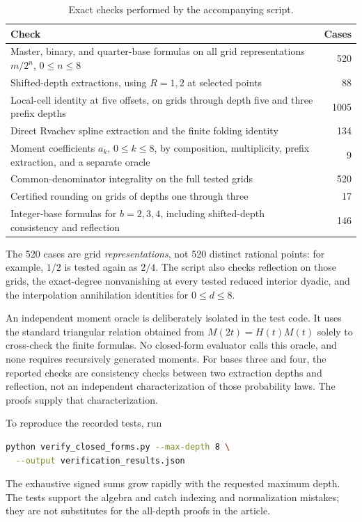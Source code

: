 \documentclass[11pt,a4paper]{article}
\numberwithin{equation}{section}
\theoremstyle{definition}
\theoremstyle{remark}
\begin{document}
\begin{table}[htbp]
\centering
\caption{Exact checks performed by the accompanying script.}
\label{tab:checks}
\begin{tabularx}{\textwidth}{@{}Xr@{}}
\toprule
Check & Cases\\
\midrule
Master, binary, and quarter-base formulas on all grid representations $m/2^n$, $0\le n\le8$ & 520\\
Shifted-depth extractions, using $R=1,2$ at selected points & 88\\
Local-cell identity at five offsets, on grids through depth five and three prefix depths & 1005\\
Direct Rvachev spline extraction and the finite folding identity & 134\\
Moment coefficients $a_k$, $0\le k\le8$, by composition, multiplicity, prefix extraction, and a separate oracle & 9\\
Common-denominator integrality on the full tested grids & 520\\
Certified rounding on grids of depths one through three & 17\\
Integer-base formulas for $b=2,3,4$, including shifted-depth consistency and reflection & 146\\
\bottomrule
\end{tabularx}
\end{table}

The 520 cases are grid \emph{representations}, not 520 distinct rational points: for example, $1/2$ is tested again as $2/4$. The script also checks reflection on those grids, the exact-degree nonvanishing at every tested reduced interior dyadic, and the interpolation annihilation identities for $0\le d\le8$.

An independent moment oracle is deliberately isolated in the test code. It uses the standard triangular relation obtained from $M(2t)=H(t)M(t)$ solely to cross-check the finite formulas. No closed-form evaluator calls this oracle, and none requires recursively generated moments. For bases three and four, the reported checks are consistency checks between two extraction depths and reflection, not an independent characterization of those probability laws. The proofs supply that characterization.

To reproduce the recorded tests, run
\begin{lstlisting}[language=bash]
python verify_closed_forms.py --max-depth 8 \
  --output verification_results.json
\end{lstlisting}
The exhaustive signed sums grow rapidly with the requested maximum depth. The tests support the algebra and catch indexing and normalization mistakes; they are not substitutes for the all-depth proofs in the article.
\end{document}
